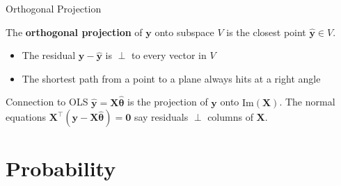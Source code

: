 \documentclass[aspectratio=169, professionalfonts]{beamer}
\begin{document}
\begin{frame}{Orthogonal Projection}

The \textbf{orthogonal projection} of $\mathbf{y}$ onto subspace $V$ is the closest point $\hat{\mathbf{y}} \in V$.

\begin{center}
\end{center}

\begin{itemize}
  \item The residual $\mathbf{y} - \hat{\mathbf{y}}$ is $\perp$ to every vector in $V$
  \item The shortest path from a point to a plane always hits at a right angle
\end{itemize}

\bigskip

\begin{alertblock}{Connection to OLS}
$\hat{\mathbf{y}} = \mathbf{X}\hat{\bm{\theta}}$ is the projection of $\mathbf{y}$ onto $\text{Im}(\mathbf{X})$. The normal equations $\mathbf{X}^\top(\mathbf{y} - \mathbf{X}\hat{\bm{\theta}}) = \mathbf{0}$ say residuals $\perp$ columns of $\mathbf{X}$.
\end{alertblock}

\end{frame}

\section{Probability}
\end{document}
